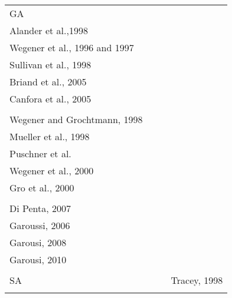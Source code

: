 \begin{table}[h]
\begin{tabular}{p{1.2cm}|p{1.8cm}|p{1.8cm}|p{1.8cm}|}
\begin{minipage}{0.1\textwidth}\scriptsize GA \end{minipage}                                                              & \cellcolor[HTML]{CD9934} \begin{minipage}{0.12\textwidth}   \tiny \textnormal{ \\  Alander et al.,1998 \cite{Alander} \\ Wegener et al., 1996 and 1997 \cite{Wegener1997}\cite{J.WegenerK.GrimmM.GrochtmannH.Sthamer1996} \\  Sullivan et al., 1998 \cite{Sullivan} \\ Briand et al., 2005 \cite{Briand2005} \\ Canfora et al., 2005 \cite{Canfora}  \\ }\end{minipage} & \cellcolor[HTML]{CD9934} \begin{minipage}{0.12\textwidth} \tiny \textrm{  \\ Wegener and Grochtmann, 1998 \cite{Wegener1998} \\  Mueller et al., 1998 \cite{Mueller1998} \\ Puschner et al. \cite{Puschner1998} \\ Wegener et al., 2000 \cite{Stations} \\ Gro et al., 2000 \cite{Gross2000}  \\ }\end{minipage}& \cellcolor[HTML]{CD9934} \begin{minipage}{0.12\textwidth}   \tiny \textnormal{ \\  Di Penta, 2007 \cite{Penta2007} \\ Garoussi, 2006 \cite{Garousi2006} \\ Garousi, 2008 \cite{Garousi2008} \\ Garousi, 2010 \cite{Garousi2010} \\ } \end{minipage} \\ \cline{2-4} 
\begin{minipage}{0.1\textwidth}\scriptsize SA \end{minipage}                                                             & \cellcolor[HTML]{FFCCC9} & \cellcolor[HTML]{FFCCC9} & \cellcolor[HTML]{CD9934} \begin{minipage}{0.12\textwidth}   \tiny  Tracey, 1998 \cite{Tracey1998} \end{minipage} \\ \cline{2-4} 
\begin{minipage}{0.1\textwidth}\scriptsize  \end{minipage} & \cellcolor[HTML]{FFCCC9} & \cellcolor[HTML]{CD9934}  & \cellcolor[HTML]{FFCCC9} \\

\end{tabular}
\end{table}
